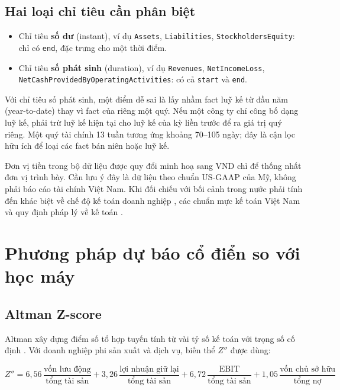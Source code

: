 \subsection{Hai loại chỉ tiêu cần phân biệt}

\begin{itemize}
\item Chỉ tiêu \textbf{số dư} (instant), ví dụ \texttt{Assets}, \texttt{Liabilities},
      \texttt{StockholdersEquity}: chỉ có \texttt{end}, đặc trưng cho một thời điểm.
\item Chỉ tiêu \textbf{số phát sinh} (duration), ví dụ \texttt{Revenues}, \texttt{NetIncomeLoss},
      \texttt{NetCashProvidedByOperatingActivities}: có cả \texttt{start} và \texttt{end}.
\end{itemize}

Với chỉ tiêu số phát sinh, một điểm dễ sai là lấy nhầm fact luỹ kế từ đầu năm (year-to-date) thay
vì fact của riêng một quý. Nếu một công ty chỉ công bố dạng luỹ kế, phải trừ luỹ kế hiện tại cho
luỹ kế của kỳ liền trước để ra giá trị quý riêng. Một quý tài chính 13 tuần tương ứng khoảng 70--105
ngày; đây là cận lọc hữu ích để loại các fact bán niên hoặc luỹ kế.

Đơn vị tiền trong bộ dữ liệu được quy đổi minh hoạ sang VND chỉ để thống nhất đơn vị trình bày. Cần
lưu ý đây là dữ liệu theo chuẩn US-GAAP của Mỹ, không phải báo cáo tài chính Việt Nam. Khi đối chiếu
với bối cảnh trong nước phải tính đến khác biệt về chế độ kế toán doanh nghiệp \cite{thongtu200},
các chuẩn mực kế toán Việt Nam \cite{vas2005} và quy định pháp lý về kế toán \cite{luatketoan2015}.

\section{Phương pháp dự báo cổ điển so với học máy}

\subsection{Altman Z-score}

Altman xây dựng điểm số tổ hợp tuyến tính từ vài tỷ số kế toán với trọng số cố định
\cite{altman1968}. Với doanh nghiệp phi sản xuất và dịch vụ, biến thể $Z''$ được dùng:

\begin{equation}
Z'' = 6{,}56\,\frac{\text{vốn lưu động}}{\text{tổng tài sản}}
    + 3{,}26\,\frac{\text{lợi nhuận giữ lại}}{\text{tổng tài sản}}
    + 6{,}72\,\frac{\text{EBIT}}{\text{tổng tài sản}}
    + 1{,}05\,\frac{\text{vốn chủ sở hữu}}{\text{tổng nợ}}
\end{equation}


